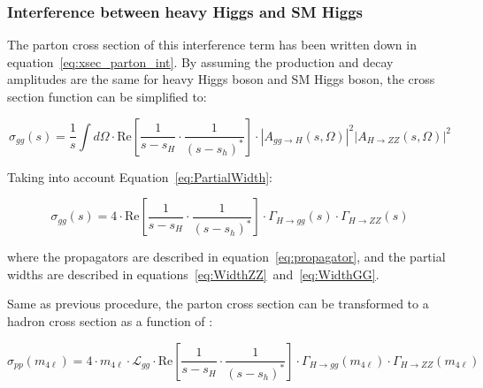 \subsubsection{Interference between heavy Higgs and SM Higgs}

The parton cross section of this interference term has been written down in equation~\ref{eq:xsec_parton_int}.
By assuming the production and decay amplitudes are the same for heavy Higgs boson and SM Higgs boson, the cross section function can be simplified to:

\begin{equation}
    \sigma_{gg} (s) = \frac{1}{s}  \int d \Omega \cdot \mathrm{Re} \left [\frac{1}{s-s_H} \cdot  \frac{1}{(s-s_h)^*} \right ] \cdot \left | A_{gg \to H}(s,\Omega) \right |^2 \left | A_{H \to ZZ}(s,\Omega) \right |^2
\end{equation}

Taking into account Equation~\ref{eq:PartialWidth}:

\begin{equation} \label{eq:HhInterference_2}
    \sigma_{gg} (s) = 4 \cdot \mathrm{Re} \left [\frac{1}{s-s_H} \cdot  \frac{1}{(s-s_h)^*} \right ] \cdot  \Gamma_{H \to gg} (s) \cdot \Gamma_{H \to ZZ} (s)
\end{equation}

where the propagators are described in equation~\ref{eq:propagator}, and the partial widths are described in equations~\ref{eq:WidthZZ}~and~\ref{eq:WidthGG}.

Same as previous procedure, the parton cross section can be transformed to a hadron cross section as a function of \mfl:

\begin{equation} \label{eq:HhInterference}
    \sigma_{pp} (m_{4\ell}) = 4 \cdot m_{4\ell} \cdot  \mathcal{L}_{gg}\cdot \mathrm{Re} \left [\frac{1}{s-s_H} \cdot  \frac{1}{(s-s_h)^*} \right ] \cdot  \Gamma_{H \to gg} (m_{4\ell}) \cdot \Gamma_{H \to ZZ} (m_{4\ell})
\end{equation}

%

